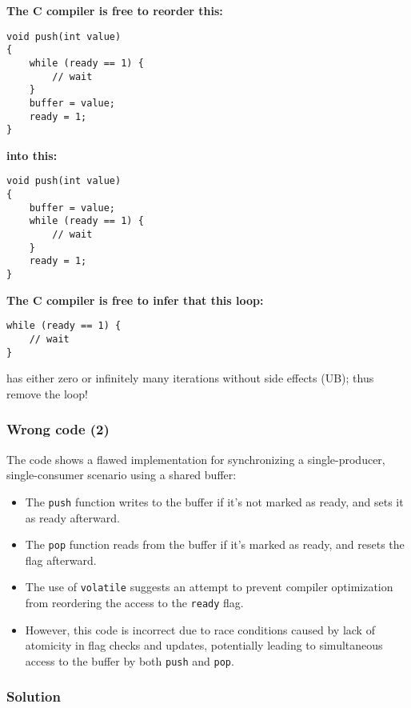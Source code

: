 \documentclass[12pt]{article}
\begin{document}
\textbf{The C compiler is free to reorder this:}

\begin{verbatim}
void push(int value)
{
    while (ready == 1) {
        // wait
    }
    buffer = value;
    ready = 1;
}
\end{verbatim}

\textbf{into this:}

\begin{verbatim}
void push(int value)
{
    buffer = value;
    while (ready == 1) {
        // wait
    }
    ready = 1;
}
\end{verbatim}


\textbf{The C compiler is free to infer that this loop:}

\begin{verbatim}
while (ready == 1) {
    // wait
}
\end{verbatim}

has either zero or infinitely many iterations without side effects (UB); thus remove the loop!

\subsubsection{Wrong code (2)}

The code shows a flawed implementation for synchronizing a single-producer, single-consumer scenario using a shared buffer:
\begin{itemize}
  \item The \texttt{push} function writes to the buffer if it's not marked as ready, and sets it as ready afterward.
  \item The \texttt{pop} function reads from the buffer if it's marked as ready, and resets the flag afterward.
  \item The use of \texttt{volatile} suggests an attempt to prevent compiler optimization from reordering the access to the \texttt{ready} flag.
  \item However, this code is incorrect due to race conditions caused by lack of atomicity in flag checks and updates, potentially leading to simultaneous access to the buffer by both \texttt{push} and \texttt{pop}.
\end{itemize}

\subsubsection{Solution}
\end{document}
